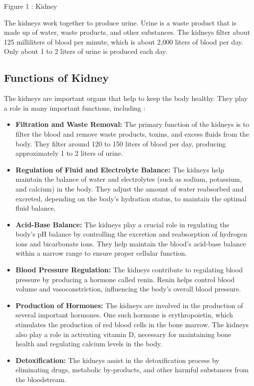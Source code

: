 \documentclass[12pt, a4paper]{article} %
\begin{document}
\begin{center}
    \def\svgwidth{5cm}
    
\end{center}
\begin{center}
    Figure 1 : Kidney
\end{center}

The kidneys work together to produce urine. Urine is a waste product that is made up of water, waste products, and other substances. The kidneys filter about 125 milliliters of blood per minute, which is about 2,000 liters of blood per day. Only about 1 to 2 liters of urine is produced each day.


\subsection{Functions of Kidney}
The kidneys are important organs that help to keep the body healthy. They play a role in many important functions, including : 

\begin{itemize}
    \item {\bf Filtration and Waste Removal:} The primary function of the kidneys is to filter the blood and remove waste products, toxins, and excess fluids from the body. They filter around 120 to 150 liters of blood per day, producing approximately 1 to 2 liters of urine.
    
    \item {\bf Regulation of Fluid and Electrolyte Balance:} The kidneys help maintain the balance of water and electrolytes (such as sodium, potassium, and calcium) in the body. They adjust the amount of water reabsorbed and excreted, depending on the body's hydration status, to maintain the optimal fluid balance.
    
    \item {\bf Acid-Base Balance:} The kidneys play a crucial role in regulating the body's pH balance by controlling the excretion and reabsorption of hydrogen ions and bicarbonate ions. They help maintain the blood's acid-base balance within a narrow range to ensure proper cellular function.
    
    \item {\bf Blood Pressure Regulation:} The kidneys contribute to regulating blood pressure by producing a hormone called renin. Renin helps control blood volume and vasoconstriction, influencing the body's overall blood pressure.
    
    \item {\bf Production of Hormones:} The kidneys are involved in the production of several important hormones. One such hormone is erythropoietin, which stimulates the production of red blood cells in the bone marrow. The kidneys also play a role in activating vitamin D, necessary for maintaining bone health and regulating calcium levels in the body.
    
    \item {\bf Detoxification: }The kidneys assist in the detoxification process by eliminating drugs, metabolic by-products, and other harmful substances from the bloodstream.
\end{itemize}
\end{document}
